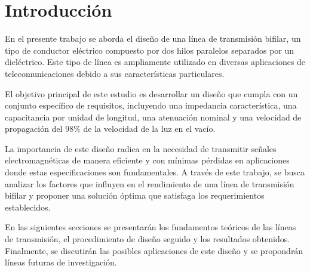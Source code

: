 \section{Introducción}

En el presente trabajo se aborda el diseño de una línea de transmisión bifilar, un tipo de conductor eléctrico compuesto por dos hilos paralelos separados por un dieléctrico. Este tipo de línea es ampliamente utilizado en diversas aplicaciones de telecomunicaciones debido a sus características particulares.

El objetivo principal de este estudio es desarrollar un diseño que cumpla con un conjunto específico de requisitos, incluyendo una impedancia característica, una capacitancia por unidad de longitud, una atenuación nominal  y una velocidad de propagación del $98 \%$ de la velocidad de la luz en el vacío.

La importancia de este diseño radica en la necesidad de transmitir señales electromagnéticas de manera eficiente y con mínimas pérdidas en aplicaciones donde estas especificaciones son fundamentales. A través de este trabajo, se busca analizar los factores que influyen en el rendimiento de una línea de transmisión bifilar y proponer una solución óptima que satisfaga los requerimientos establecidos.

En las siguientes secciones se presentarán los fundamentos teóricos de las líneas de transmisión, el procedimiento de diseño seguido y los resultados obtenidos. Finalmente, se discutirán las posibles aplicaciones de este diseño y se propondrán líneas futuras de investigación.


\pagebreak
